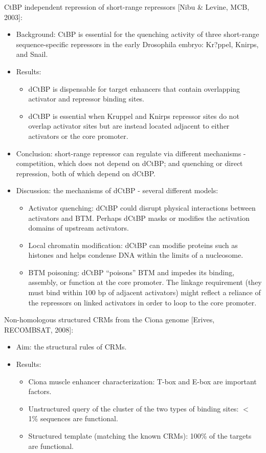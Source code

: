 \documentclass{report}
\begin{document}
\begin{enumerate}
	CtBP independent repression of short-range repressors [Nibu \& Levine, MCB, 2003]:
	\begin{itemize}
		\item Background: CtBP is essential for the quenching activity of three short-range sequence-specific repressors in the early Drosophila embryo: Kr?ppel, Knirps, and Snail.
		
		\item Results: 
		\begin{itemize}
			\item dCtBP is dispensable for target enhancers that contain overlapping activator and repressor binding sites.
			\item dCtBP is essential when Kruppel and Knirps repressor sites do not overlap activator sites but are instead located adjacent to either activators or the core promoter. 
		\end{itemize}
		
		\item Conclusion: short-range repressor can regulate via different mechanisms - competition, which does not depend on dCtBP; and quenching or direct repression, both of which depend on dCtBP. 
		
		\item Discussion: the mechanisms of dCtBP - several different models:
		\begin{itemize}
			\item Activator quenching: dCtBP could disrupt physical interactions between activators and BTM. Perhaps dCtBP masks or modifies the activation domains of upstream activators. 
			\item Local chromatin modification: dCtBP can modifie proteins such as histones and helps condense DNA within the limits of a nucleosome.
			\item BTM poisoning: dCtBP ``poisons'' BTM and impedes its binding, assembly, or function at the core promoter. The linkage requirement (they must bind within 100 bp of adjacent activators) might reflect a reliance of the repressors on linked activators in order to loop to the core promoter.
		\end{itemize}
	\end{itemize}
	
	Non-homologous structured CRMs from the Ciona genome [Erives, RECOMBSAT, 2008]:
	\begin{itemize}
		\item Aim: the structural rules of CRMs. 
		
		\item Results: 
		\begin{itemize}
			\item Ciona muscle enhancer characterization: T-box and E-box are important factors. 
			\item Unstructured query of the cluster of the two types of binding sites: $<$ 1\% sequences are functional. 
			\item Structured template (matching the known CRMs): 100\% of the targets are functional. 
		\end{itemize}
	\end{itemize}
	

\end{enumerate}
\end{document}
